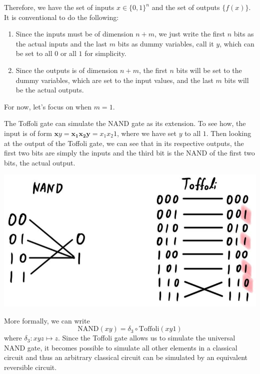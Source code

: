 \documentclass{article}
\begin{document}
    Therefore, we have the set of inputs $x \in \{0, 1\}^n$ and the set of outputs $\{f(x)\}$. It is conventional to do the following: 
    \begin{enumerate} 
      \item Since the inputs must be of dimension $n+m$, we just write the first $n$ bits as the actual inputs and the last $m$ bits as dummy variables, call it $y$, which can be set to all $0$ or all $1$ for simplicity.  
      \item Since the outputs is of dimension $n+m$, the first $n$ bits will be set to the dummy variables, which are set to the input values, and the last $m$ bits will be the actual outputs. 
    \end{enumerate}

    For now, let's focus on when $m = 1$. 

    \begin{example}
      The Toffoli gate can simulate the NAND gate as its extension. To see how, the input is of form $\mathbf{x} y = \mathbf{x_1 x_2 y} = x_1 x_2 1$, where we have set $y$ to all $1$. Then looking at the output of the Toffoli gate, we can see that in its respective outputs, the first two bits are simply the inputs and the third bit is the NAND of the first two bits, the actual output. 

      \begin{center}
        \includegraphics[scale=0.3]{img/Toffoli_NAND_extension.jpg}
      \end{center}
      More formally, we can write 
      \begin{equation} 
        \text{NAND}(xy) = \delta_3 \circ \text{Toffoli}(xy1)
      \end{equation}
      where $\delta_3: xyz \mapsto z$. Since the Toffoli gate allows us to simulate the universal NAND gate, it becomes possible to simulate all other elements in a classical circuit and thus an arbitrary classical circuit can be simulated by an equivalent reversible circuit.
    \end{example}
\end{document}
